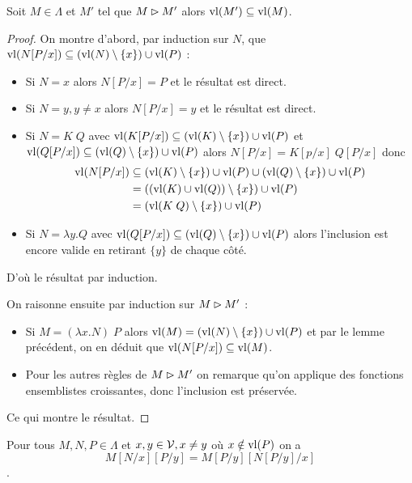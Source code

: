 \begin{prop}
    Soit $M\in\Lambda$ et $M'$ tel que $M\rhd M'$ alors $\mathrm{vl}(M')\subseteq\mathrm{vl}(M)$.
\end{prop}

\begin{proof}
    On montre d'abord, par induction sur $N$, que $\mathrm{vl}(N[P/x]) \subseteq (\mathrm{vl}(N)\setminus \{x\})\cup\mathrm{vl}(P)$ :
    \begin{itemize}[label=$\bullet$]
        \item Si $N = x$ alors $N[P/x] = P$ et le résultat est direct.
        \item Si $N = y,y\neq x$ alors $N[P/x] = y$ et le résultat est direct.
        \item Si $N = K\;Q$ avec $\mathrm{vl}(K[P/x]) \subseteq (\mathrm{vl}(K)\setminus \{x\})\cup\mathrm{vl}(P)$ et $\mathrm{vl}(Q[P/x]) \subseteq (\mathrm{vl}(Q)\setminus \{x\})\cup\mathrm{vl}(P)$ alors $N[P/x] = K[p/x]\;Q[P/x]$ donc \begin{align*} \mathrm{vl}(N[P/x]) &\subseteq (\mathrm{vl}(K)\setminus \{x\})\cup\mathrm{vl}(P) \cup (\mathrm{vl}(Q)\setminus \{x\})\cup\mathrm{vl}(P)\\ &= ((\mathrm{vl}(K)\cup\mathrm{vl}(Q))\setminus\{x\})\cup\mathrm{vl}(P) \\&= (\mathrm{vl}(K\;Q)\setminus\{x\})\cup\mathrm{vl}(P) \end{align*}
        \item Si $N = \lambda y.Q$ avec $\mathrm{vl}(Q[P/x]) \subseteq (\mathrm{vl}(Q)\setminus \{x\})\cup\mathrm{vl}(P)$ alors l'inclusion est encore valide en retirant $\{y\}$ de chaque côté.
    \end{itemize}
    D'où le résultat par induction.

    On raisonne ensuite par induction sur $M\rhd M'$ :
    \begin{itemize}[label=$\bullet$]
        \item Si $M = (\lambda x.N)\;P$ alors $\mathrm{vl}(M) = (\mathrm{vl}(N)\setminus \{x\})\cup\mathrm{vl}(P)$ et par le lemme précédent, on en déduit que $\mathrm{vl}(N[P/x])\subseteq \mathrm{vl}(M)$.
        \item Pour les autres règles de $M\rhd M'$ on remarque qu'on applique des fonctions ensemblistes croissantes, donc l'inclusion est préservée.
    \end{itemize}
    Ce qui montre le résultat.
\end{proof}

\begin{prop}
    Pour tous $M,N,P\in\Lambda$ et $x,y\in\mathcal V,x\neq y$ où $x\notin\mathrm{vl}(P)$ on a $$M[N/x][P/y] = M[P/y][N[P/y]/x]$$.
\end{prop}

